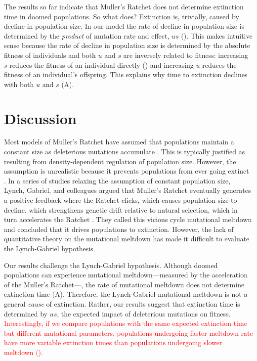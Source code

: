 \documentclass[9pt,lineno]{elife}
\newcommand{\red}{\textcolor{red}}
\begin{document}
The results so far indicate that Muller's Ratchet does not determine extinction time in doomed populations.  So what does?
%
Extinction is, trivially, caused by decline in population size.  In our model the rate of decline in population size is determined by the \textit{product} of mutation rate and effect, $us$ ().  This makes intuitive sense because the rate of decline in population size is determined by the absolute fitness of individuals and both $u$ and $s$ are inversely related to fitness: 
increasing $s$ reduces the fitness of an individual directly () and increasing $u$ reduces the fitness of an individual's offspring.
%
This explains why time to extinction declines with both $u$ and $s$ (A).




\section{Discussion}




Most models of Muller's Ratchet have assumed that populations maintain a constant size as deleterious mutations accumulate \citep{Haigh_The_1978, Gessler_The_1995, Gordo_On_2000, gor00b, Rouzine_The_2003, met13}.
This is typically justified as resulting from density-dependent regulation of population size.  
However, the assumption is unrealistic because it prevents populations from ever going extinct \citep{Lynch_MUTATION_1990, mel91}.  
%
In a series of studies relaxing the assumption of constant population size, Lynch, Gabriel, and colleagues argued that Muller's Ratchet eventually generates a positive feedback where
the Ratchet clicks, 
which causes population size to decline, 
which strengthens genetic drift relative to natural selection,
which in turn accelerates the Ratchet \citep{Lynch_MUTATION_1990, lyn93, Gabriel_MULLER_1993}.  
They called this vicious cycle mutational meltdown and concluded that it drives populations to extinction.  
However, the lack of quantitative theory on the mutational meltdown has made it difficult to evaluate the Lynch-Gabriel hypothesis.

Our results challenge the Lynch-Gabriel hypothesis.  Although doomed populations can experience mutational meltdown---measured by the acceleration of the Muller's Ratchet---, the rate of mutational meltdown does not determine extinction time (A).  Therefore, the Lynch-Gabriel mutational meltdown is not a general \textit{cause} of extinction.  Rather, our results suggest that extinction time is determined by $us$, the expected impact of deleterious mutations on fitness.  
\red{Interestingly, if we compare populations with the same expected extinction time but different mutational parameters, populations undergoing faster meltdown rate have more variable extinction times than populations undergoing slower meltdown  ().}
\end{document}
